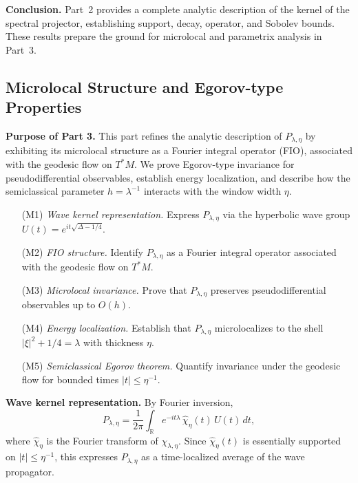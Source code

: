 \medskip
\noindent\textbf{Conclusion.}
Part~2 provides a complete analytic description of the kernel of the spectral projector,
establishing support, decay, operator, and Sobolev bounds.
These results prepare the ground for microlocal and parametrix analysis in Part~3.


\subsection{Microlocal Structure and Egorov-type Properties}
\label{subsec:proj-microlocal}

\noindent\textbf{Purpose of Part 3.}
This part refines the analytic description of $P_{\lambda,\eta}$ by exhibiting its
microlocal structure as a Fourier integral operator (FIO), associated with the geodesic flow
on $T^*M$.
We prove Egorov-type invariance for pseudodifferential observables, establish energy localization,
and describe how the semiclassical parameter $h=\lambda^{-1}$ interacts with the window width $\eta$.

\begin{itemize}
  \item[(M1)] \emph{Wave kernel representation.} Express $P_{\lambda,\eta}$ via the hyperbolic wave group $U(t)=e^{it\sqrt{\Delta-1/4}}$.
  \item[(M2)] \emph{FIO structure.} Identify $P_{\lambda,\eta}$ as a Fourier integral operator associated with the geodesic flow on $T^*M$.
  \item[(M3)] \emph{Microlocal invariance.} Prove that $P_{\lambda,\eta}$ preserves pseudodifferential observables up to $O(h)$.
  \item[(M4)] \emph{Energy localization.} Establish that $P_{\lambda,\eta}$ microlocalizes to the shell $|\xi|^2+1/4=\lambda$ with thickness $\eta$.
  \item[(M5)] \emph{Semiclassical Egorov theorem.} Quantify invariance under the geodesic flow for bounded times $|t|\le\eta^{-1}$.
\end{itemize}

\medskip
\noindent\textbf{Wave kernel representation.}
By Fourier inversion,
\[
  P_{\lambda,\eta} = \frac{1}{2\pi}\int_{\mathbb{R}} e^{-it\lambda}\,\widehat{\chi}_{\eta}(t)\,U(t)\,dt,
\]
where $\widehat{\chi}_{\eta}$ is the Fourier transform of $\chi_{\lambda,\eta}$.
Since $\widehat{\chi}_{\eta}(t)$ is essentially supported on $|t|\le \eta^{-1}$,
this expresses $P_{\lambda,\eta}$ as a time-localized average of the wave propagator.

